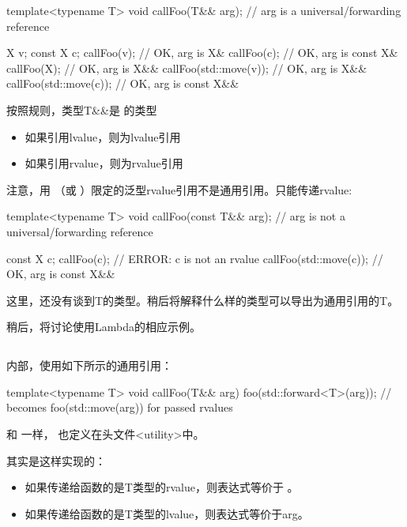 \begin{cppcode}
template<typename T>
void callFoo(T&& arg); // arg is a universal/forwarding reference

X v;
const X c;
callFoo(v); // OK, arg is X&
callFoo(c); // OK, arg is const X&
callFoo(X{}); // OK, arg is X&&
callFoo(std::move(v)); // OK, arg is X&&
callFoo(std::move(c)); // OK, arg is const X&&
\end{cppcode}

按照规则，类型T\&\&是  的类型

\begin{itemize}
	\item 如果引用lvalue，则为lvalue引用
	\item 如果引用rvalue，则为rvalue引用
\end{itemize}

注意，用 （或 ）限定的泛型rvalue引用不是通用引用。只能传递rvalue:

\begin{cppcode}
template<typename T>
void callFoo(const T&& arg); // arg is not a universal/forwarding reference

const X c;
callFoo(c); // ERROR: c is not an rvalue
callFoo(std::move(c)); // OK, arg is const X&&
\end{cppcode}

这里，还没有谈到T的类型。稍后将解释什么样的类型可以导出为通用引用的T。

稍后，将讨论使用Lambda的相应示例。

\subsection{}

 内部，使用如下所示的通用引用：

\begin{cppcode}
template<typename T>
void callFoo(T&& arg) {
	foo(std::forward<T>(arg)); // becomes foo(std::move(arg)) for passed rvalues
}
\end{cppcode}

和  一样， 也定义在头文件<utility>中。

 其实是这样实现的：

\begin{itemize}
	\item 如果传递给函数的是T类型的rvalue，则表达式等价于 。
	\item 如果传递给函数的是T类型的lvalue，则表达式等价于arg。
\end{itemize}

